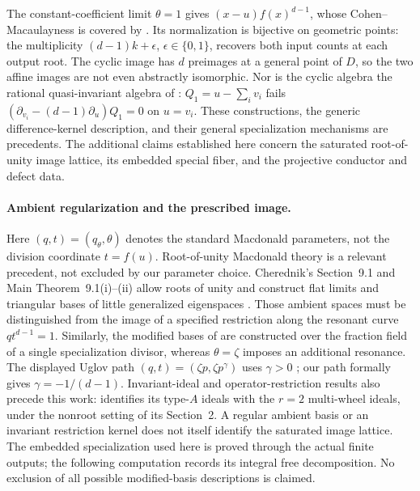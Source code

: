 \documentclass[10pt,fleqn]{article}
\numberwithin{equation}{section}
\begin{document}
The constant-coefficient limit $\theta=1$ gives $(x-u)f(x)^{d-1}$,
whose Cohen--Macaulayness is covered by
\cite[Theorem~2.1 and Proposition~2.2]{BrooknerCorwinEtingofSam}.
Its normalization is bijective on geometric points: the multiplicity
$(d-1)k+\epsilon$, $\epsilon\in\{0,1\}$, recovers both input counts at
each output root.  The cyclic image has $d$ preimages at a general point
of $D$, so the two affine images are not even abstractly isomorphic.
Nor is the cyclic algebra the rational quasi-invariant algebra of
\cite[Section~4]{SergeevVeselovCMS}: $Q_1=u-\sum_i v_i$ fails
$(\partial_{v_i}-(d-1)\partial_u)Q_1=0$ on $u=v_i$.
These constructions, the generic difference-kernel description, and
their general specialization mechanisms are precedents.  The additional
claims established here concern the saturated root-of-unity image lattice,
its embedded special fiber, and the projective conductor and defect data.

\paragraph{Ambient regularization and the prescribed image.}
Here $(q,t)=(q_\theta,\theta)$ denotes the standard Macdonald parameters,
not the division coordinate $t=f(u)$.  Root-of-unity Macdonald theory
is a relevant precedent, not excluded by our parameter choice.  Cherednik's Section~9.1 and Main
Theorem~9.1(i)--(ii) allow roots of unity and construct flat limits and
triangular bases of little generalized eigenspaces
\cite{CherednikNonsemisimple}.
Those ambient spaces must be distinguished from the image of a specified
restriction along the resonant curve $qt^{d-1}=1$.
Similarly, the modified bases of
\cite[Definition~3.3 and Theorem~3.14]{KasataniModified} are constructed
over the fraction field of a single specialization divisor, whereas
$\theta=\zeta$ imposes an additional resonance.
The displayed Uglov path $(q,t)=(\zeta p,\zeta p^\gamma)$ uses $\gamma>0$
\cite[Section~4.4]{UglovRootLimit}; our path formally gives
$\gamma=-1/(d-1)$.
Invariant-ideal and operator-restriction results also precede this work:
\cite[Theorem~3.3 and Remark~3.4]{FeiginSilantyev} identifies its type-$A$
ideals with the $r=2$ multi-wheel ideals, under the nonroot setting of
its Section~2.
A regular ambient basis or an invariant restriction kernel does not
itself identify the saturated image lattice.  The embedded specialization
used here is proved through the actual finite outputs; the following computation
records its integral free decomposition.  No exclusion of all possible
modified-basis descriptions is claimed.
\end{document}
